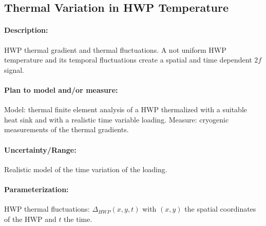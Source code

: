 \subsection{Thermal Variation in HWP Temperature}

\paragraph{Description:}
HWP thermal gradient and thermal fluctuations. A not uniform HWP temperature and its temporal fluctuations create a spatial and time dependent 2$f$ signal.

\paragraph{Plan to model and/or measure:}
Model: thermal finite element analysis of a HWP thermalized with a suitable heat sink and with a realistic time variable loading.
Measure: cryogenic measurements of the thermal gradients.


\paragraph{Uncertainty/Range:}
Realistic model of the time variation of the loading.


\paragraph{Parameterization:}
HWP thermal fluctuations: $\Delta_{HWP}(x,y,t)$ with $(x,y)$ the spatial coordinates of the HWP and $t$ the time.
